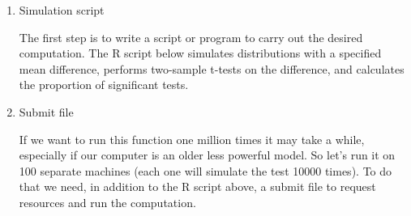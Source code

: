 \documentclass[]{book}
\newenvironment{Shaded}{\begin{snugshade}}{\end{snugshade}}
\newcommand{\KeywordTok}[1]{\textcolor[rgb]{0.13,0.29,0.53}{\textbf{#1}}}
\newcommand{\DataTypeTok}[1]{\textcolor[rgb]{0.13,0.29,0.53}{#1}}
\newcommand{\DecValTok}[1]{\textcolor[rgb]{0.00,0.00,0.81}{#1}}
\newcommand{\FloatTok}[1]{\textcolor[rgb]{0.00,0.00,0.81}{#1}}
\newcommand{\StringTok}[1]{\textcolor[rgb]{0.31,0.60,0.02}{#1}}
\newcommand{\ControlFlowTok}[1]{\textcolor[rgb]{0.13,0.29,0.53}{\textbf{#1}}}
\newcommand{\OperatorTok}[1]{\textcolor[rgb]{0.81,0.36,0.00}{\textbf{#1}}}
\newcommand{\NormalTok}[1]{#1}
\begin{document}
\begin{enumerate}
\def\labelenumi{\arabic{enumi}.}
\item
  Simulation script

  The first step is to write a script or program to carry out the
  desired computation. The R script below simulates distributions with a
  specified mean difference, performs two-sample t-tests on the
  difference, and calculates the proportion of significant tests.

\begin{Shaded}
\end{Shaded}
\item
  Submit file

  If we want to run this function one million times it may take a while,
  especially if our computer is an older less powerful model. So let's
  run it on 100 separate machines (each one will simulate the test 10000
  times). To do that we need, in addition to the R script above, a
  submit file to request resources and run the computation.


\end{enumerate}
\end{document}
